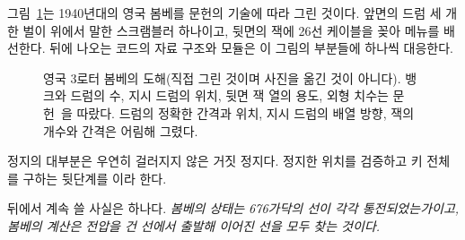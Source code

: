 그림~\ref{fig:g-bombe-front}는 1940년대의 영국 봄베를 문헌의 기술에 따라 그린 것이다. 앞면의 드럼 세 개
한 벌이 위에서 말한 스크램블러 하나이고, 뒷면의 잭에 26선 케이블을 꽂아 메뉴를 배선한다. 뒤에 나오는 코드의
자료 구조와 모듈은 이 그림의 부분들에 하나씩 대응한다.

\begin{figure}[p]
\centering

\caption{영국 3로터 봄베의 도해(직접 그린 것이며 사진을 옮긴 것이 아니다). 뱅크와 드럼의 수, 지시 드럼의
위치, 뒷면 잭 열의 용도, 외형 치수는 문헌~\cite{us6812report1944,ellsbury1998bombe,jackson-bh10}을
따랐다. 드럼의 정확한 간격과 위치, 지시 드럼의 배열 방향, 잭의 개수와 간격은 어림해 그렸다.}
\label{fig:g-bombe-front}
\end{figure}

정지의 대부분은 우연히 걸러지지 않은 거짓 정지다. 정지한 위치를 검증하고 키 전체를 구하는 뒷단계를
이라 한다.

뒤에서 계속 쓸 사실은 하나다. \emph{봄베의 상태는 676가닥의 선이 각각 통전되었는가이고, 봄베의 계산은
전압을 건 선에서 출발해 이어진 선을 모두 찾는 것이다.}
